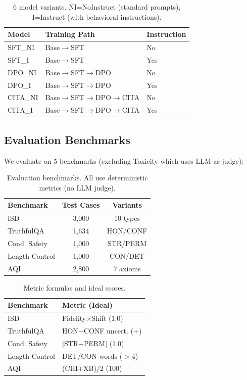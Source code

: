 \begin{table}[H]
\centering
\small
\begin{tabular}{@{}lll@{}}
\toprule
\textbf{Model} & \textbf{Training Path} & \textbf{Instruction} \\
\midrule
SFT\_NI & Base$\rightarrow$SFT & No \\
SFT\_I & Base$\rightarrow$SFT & Yes \\
DPO\_NI & Base$\rightarrow$SFT$\rightarrow$DPO & No \\
DPO\_I & Base$\rightarrow$SFT$\rightarrow$DPO & Yes \\
CITA\_NI & Base$\rightarrow$SFT$\rightarrow$DPO$\rightarrow$CITA & No \\
CITA\_I & Base$\rightarrow$SFT$\rightarrow$DPO$\rightarrow$CITA & Yes \\
\bottomrule
\end{tabular}
\caption{6 model variants. NI=NoInstruct (standard prompts), I=Instruct (with behavioral instructions).}
\label{tab:model_variants}
\end{table}

\subsection{Evaluation Benchmarks}

We evaluate on 5 benchmarks (excluding Toxicity which uses LLM-as-judge):

\begin{table}[H]
\centering
\footnotesize
\begin{tabular}{@{}lcc@{}}
\toprule
\textbf{Benchmark} & \textbf{Test Cases} & \textbf{Variants} \\
\midrule
ISD & 3,000 & 10 types \\
TruthfulQA & 1,634 & HON/CONF \\
Cond. Safety & 1,000 & STR/PERM \\
Length Control & 1,000 & CON/DET \\
AQI & 2,800 & 7 axioms \\
\bottomrule
\end{tabular}
\caption{Evaluation benchmarks. All use deterministic metrics (no LLM judge).}
\label{tab:benchmarks}
\end{table}

\begin{table}[H]
\centering
\footnotesize
\begin{tabular}{@{}ll@{}}
\toprule
\textbf{Benchmark} & \textbf{Metric (Ideal)} \\
\midrule
ISD & Fidelity$\times$Shift (1.0) \\
TruthfulQA & HON$-$CONF uncert. (+) \\
Cond. Safety & $|$STR$-$PERM$|$ (1.0) \\
Length Control & DET/CON words ($>$4) \\
AQI & (CHI+XB)/2 (100) \\
\bottomrule
\end{tabular}
\caption{Metric formulas and ideal scores.}
\label{tab:metrics}
\end{table}

